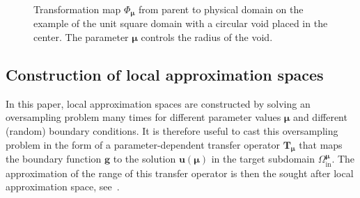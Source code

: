 \documentclass[a4paper]{eccomas_paper-2024}
\newcommand{\m}{\bm\mu}
\begin{document}
\begin{figure}
    \centering
    
    \caption{Transformation map $\Phi_{\bm\mu}$ from parent to physical domain on the example of the unit square domain with a circular void placed in the center. The parameter $\bm\mu$ controls the radius of the void.}\label{fig:transformationmap}
\end{figure}


\subsection{Construction of local approximation spaces} %
\label{sub:Construction of local approximation spaces}
In this paper, local approximation spaces are constructed by solving an oversampling problem many times for different parameter values $\bm\mu$ and different (random) boundary conditions.
It is therefore useful to cast this oversampling problem in the form of a parameter-dependent transfer operator $\bm{T}_{\bm\mu}$ that
maps the boundary function $\bm{g}$ to the solution $\bm{u}(\bm\mu)$ in the target subdomain $\varOmega^{\m}_{\mathrm{in}}$.
The approximation of the range of this transfer operator is then the sought after local approximation space, see~\cite{Buhr2018Randomized}.
\end{document}
